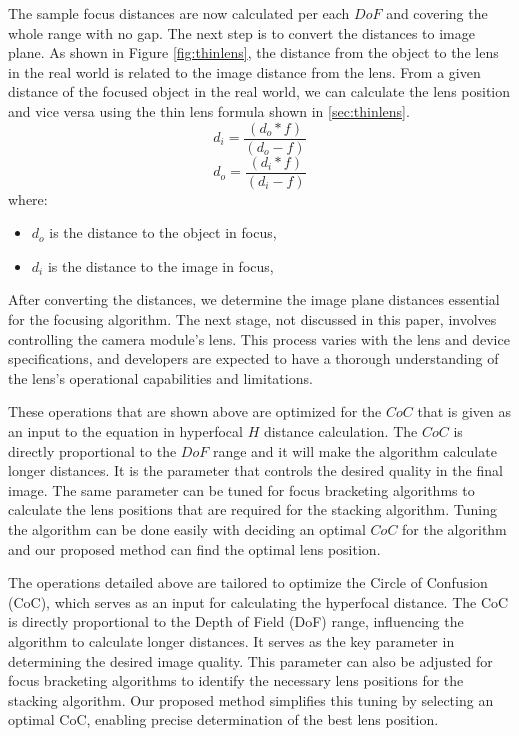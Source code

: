 \documentclass{article}
\begin{document}
The sample focus distances are now calculated per each  \( DoF \) and covering the whole range with no gap. The next step is to convert the distances to image plane. As shown in Figure \ref{fig:thinlens}, the distance from the object to the lens in the real world is related to the image distance from the lens. From a given distance of the focused object in the real world, we can calculate the lens position and vice versa using the thin lens formula shown in \ref{sec:thinlens}.
\[
d_i = \frac{(d_o*f)} {(d_o-f)}
\]
\[
d_o = \frac{(d_i*f)} {(d_i-f)}
\]
where:
\begin{itemize}
    \item \( d_o \) is the distance to the object in focus,
    \item \( d_i \) is the distance to the image in focus,
\end{itemize}

After converting the distances, we determine the image plane distances essential for the focusing algorithm. The next stage, not discussed in this paper, involves controlling the camera module's lens. This process varies with the lens and device specifications, and developers are expected to have a thorough understanding of the lens's operational capabilities and limitations.

These operations that are shown above are optimized for the  \( CoC \) that is given as an input to the equation in hyperfocal  \( H \)  distance calculation. The  \( CoC \) is directly proportional to the  \( DoF \) range and it will make the algorithm calculate longer distances. It is the parameter that controls the desired quality in the final image. The same parameter can be tuned for focus bracketing algorithms to calculate the lens positions that are required for the stacking algorithm. Tuning the algorithm can be done easily with deciding an optimal  \( CoC \) for the algorithm and our proposed method can find the optimal lens position. 

The operations detailed above are tailored to optimize the Circle of Confusion (CoC), which serves as an input for calculating the hyperfocal distance. The CoC is directly proportional to the Depth of Field (DoF) range, influencing the algorithm to calculate longer distances. It serves as the key parameter in determining the desired image quality. This parameter can also be adjusted for focus bracketing algorithms to identify the necessary lens positions for the stacking algorithm. Our proposed method simplifies this tuning by selecting an optimal CoC, enabling precise determination of the best lens position.
\end{document}

